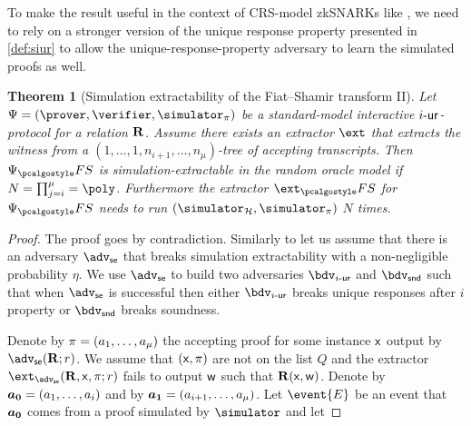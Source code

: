 \documentclass[runningheads]{llncs}
\let\spvec\vec
\let\vec\accentvec
\let\vec\spvec
\def\vec#1{\mathchoice{\mbox{\boldmath$\displaystyle#1$}}
	{\mbox{\boldmath$\textstyle#1$}}
	{\mbox{\boldmath$\scriptstyle#1$}}
	{\mbox{\boldmath$\scriptscriptstyle#1$}}}
\newtheorem{theorem}{Theorem}%
\theoremstyle{definition}
\begin{document}
To make the result useful in the context of CRS-model zkSNARKs like \plonk, we need to rely on a stronger version of the unique response property presented in \cref{def:siur} to allow the unique-response-property adversary to learn the simulated proofs as well.

\begin{theorem}[Simulation extractability of the Fiat--Shamir transform II]
	\label{thm:wit_ext_em_FS}
	Let $\proofsystem = (\prover, \verifier, \simulator_\zkproof)$ be a standard-model interactive ${i\text{-}\mathsf{ur}}$-protocol for a relation $\mathbf{R}$. 
	Assume there exists an extractor $\ext$ that extracts the witness from a $(1, \ldots, 1, n_{i + 1}, \ldots, n_\mu)$-tree of accepting transcripts. 
	Then $\proofsystem_\fs$ is simulation-extractable in the random oracle model if $N =\prod_{j = i}^\mu = \poly$.
	Furthermore the extractor $\ext_\fs$ for $\proofsystem_\fs$ needs to run $(\simulator_\ro, \simulator_\zkproof)$ $N$ times.
\end{theorem}
\begin{proof}
	The proof goes by contradiction. Similarly to \cite{INDOCRYPT:FKMV12} 
	let us assume that there is an adversary $\adv_{\se}$ that breaks simulation extractability with a non-negligible probability $\eta$. We use $\adv_\se$ to build two adversaries $\bdv_\ur{i}$ and $\bdv_\snd$ such that when $\adv_\se$ is successful then either $\bdv_\ur{i}$ breaks unique responses after $i$ property or $\bdv_\snd$ breaks soundness.
	
	Denote by $\pi = (a_1, \ldots, a_\mu)$ the accepting proof for some instance $\mathsf{x}$ output by $\adv_\se(\REL; r)$. We assume that $(\mathsf{x}, \pi)$ are not on the list $Q$ and the extractor $\ext_{\adv_\se}(\REL, \inp, \zkproof; r)$ fails to output $\mathsf{w}$ such that $\mathbf{R}(\mathsf{x}, \mathsf{w})$. 
	Denote by $\vec{a_0} = (a_1, \ldots, a_i)$ and by $\vec{a_1} = (a_{i + 1}, \ldots, a_\mu)$.
	Let $\event{E}$ be an event that $\vec{a_0}$ comes from a proof simulated by $\simulator$ and let 
\end{proof}
% 
\end{document}
